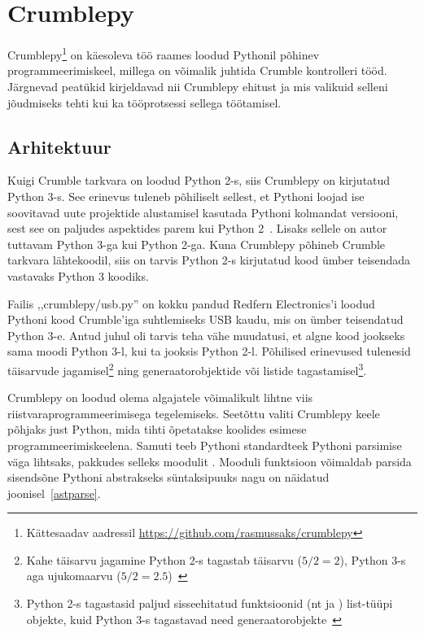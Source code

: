 \documentclass[12pt]{article}
\begin{document}
\section{Crumblepy} \label{crpy}

Crumblepy\footnote{Kättesaadav aadressil \url{https://github.com/rasmussaks/crumblepy}} on käesoleva töö raames loodud Pythonil põhinev programmeerimiskeel, millega on võimalik juhtida Crumble kontrolleri tööd. Järgnevad peatükid kirjeldavad nii Crumblepy ehitust ja mis valikuid selleni jõudmiseks tehti kui ka tööprotsessi sellega töötamisel.

\subsection{Arhitektuur}

Kuigi Crumble tarkvara on loodud Python 2-s, siis Crumblepy on kirjutatud Python 3-s. See erinevus tuleneb põhiliselt sellest, et Pythoni loojad ise soovitavad uute projektide alustamisel kasutada Pythoni kolmandat versiooni, sest see on paljudes aspektides parem kui Python 2~\cite{Python2orPython3-PythonWiki}. Lisaks sellele on autor tuttavam Python 3-ga kui Python 2-ga. Kuna Crumblepy põhineb Crumble tarkvara lähtekoodil, siis on tarvis Python 2-s kirjutatud kood ümber teisendada vastavaks Python 3 koodiks. 

Failis ,,crumblepy/usb.py'' on kokku pandud Redfern Electronics'i loodud Pythoni kood Crumble'iga suhtlemiseks USB kaudu, mis on ümber teisendatud Python 3-e. Antud juhul oli tarvis teha vähe muudatusi, et algne kood jookseks sama moodi Python 3-l, kui ta jooksis Python 2-l. Põhilised erinevused tulenesid täisarvude jagamisel\footnote{Kahe täisarvu jagamine Python 2-s tagastab täisarvu ($5/2 = 2$), Python 3-s aga ujukomaarvu ($5/2 = 2.5$)~\cite{KeyDifferences}} ning generaatorobjektide või listide tagastamisel\footnote{Python 2-s tagastasid paljud sisseehitatud funktsioonid (nt  ja ) list-tüüpi objekte, kuid Python 3-s tagastavad need generaatorobjekte~\cite{KeyDifferences}}.

Crumblepy on loodud olema algajatele võimalikult lihtne viis riistvaraprogrammeerimisega tegelemiseks. Seetõttu valiti Crumblepy keele põhjaks just Python, mida tihti õpetatakse koolides esimese programmeerimiskeelena. Samuti teeb Pythoni standardteek Pythoni parsimise väga lihtsaks, pakkudes selleks  moodulit \cite{PythonAST}. Mooduli funktsioon  võimaldab parsida sisendsõne Pythoni abstrakseks süntaksipuuks nagu on näidatud joonisel~\ref{astparse}.
\end{document}
